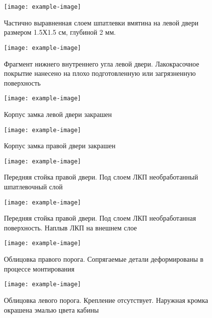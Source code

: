 {%
   \begin{figure}[H]\centering
   	\parbox[t]{0.49\textwidth}
   	{\centering
   		\texttt{[image: example-image]}
   		\caption{\footnotesize {Частично выравненная слоем шпатлевки вмятина на левой двери размером 1.5Х1.5 см, глубиной 2 мм.}}
   		\label{дверьшпатлевка}}
   	\hfil \hfil
   	\parbox[t]{0.49\textwidth}
   	{\centering
   		\texttt{[image: example-image]}
   		\caption{\footnotesize {Фрагмент нижнего  внутреннего угла  левой двери. Лакокрасочное покрытие нанесено на плохо подготовленную или загрязненную поверхность}}
   		\label{дверьлеваявнутри}}
   \end{figure}
%   
%   
%   
   \begin{figure}[H]\centering
   	\parbox[t]{0.49\textwidth}
   	{\centering
   		\texttt{[image: example-image]}
   		\caption{\footnotesize {Корпус замка левой двери закрашен}}
   		\label{замоклевый}}
   	\hfil \hfil
   	\parbox[t]{0.49\textwidth}
   	{\centering
   		\texttt{[image: example-image]}
   		\caption{\footnotesize {Корпус замка правой двери закрашен}}
   		\label{замокправый}}
   \end{figure}
%   
   
    \begin{figure}[H]\centering
   	\parbox[t]{0.49\textwidth}
   	{\centering
   		\texttt{[image: example-image]}
   		\caption{\footnotesize {Передняя стойка правой двери. Под слоем ЛКП необработанный шпатлевочный слой}}
   		\label{шпатлевкасправа}}
   	\hfil \hfil
   	\parbox[t]{0.49\textwidth}
   	{\centering
   		\texttt{[image: example-image]}
   		\caption{\footnotesize {Передняя стойка правой двери. Под слоем ЛКП необработанная поверхность. Наплыв ЛКП на внешнем слое}}
   		\label{стойканаплыв}}
   \end{figure}





 \begin{figure}[H]\centering
	\parbox[t]{0.49\textwidth}
	{\centering
		\texttt{[image: example-image]}
		\caption{\footnotesize {Облицовка правого порога.  Сопрягаемые детали деформированы в процессе монтирования}}
		\label{облицовкасправа}}
	\hfil \hfil
	\parbox[t]{0.49\textwidth}
	{\centering
		\texttt{[image: example-image]}
		\caption{\footnotesize {Облицовка левого порога. Крепление отсутствует. Наружная кромка окрашена эмалью цвета кабины}}
		\label{облицовкаслева}}
\end{figure}
%   
   

}
